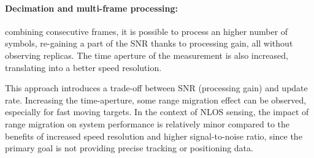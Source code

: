      \paragraph{Decimation and multi-frame processing:}
     combining consecutive frames, it is possible to process an higher number of symbols, re-gaining a part of the SNR thanks to processing gain, all without observing replicas. The time aperture of the measurement is also increased, translating into a better speed resolution.

     This approach introduces a trade-off between SNR (processing gain) and update rate. Increasing the time-aperture, some range migration effect can be observed, especially for fast moving targets. In the context of NLOS sensing, the impact of range migration on system performance is relatively minor compared to the benefits of increased speed resolution and higher signal-to-noise ratio, since the primary goal is not providing precise tracking or positioning data.


